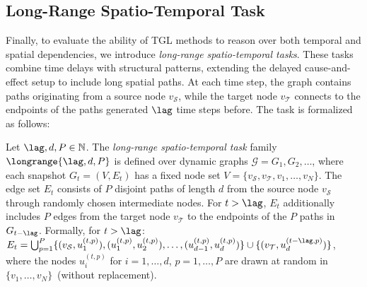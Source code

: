 

\subsection{Long-Range Spatio-Temporal Task}
Finally, to evaluate the ability of TGL methods to reason over both temporal and spatial dependencies, we introduce  \emph{long-range spatio-temporal tasks}. These tasks combine time delays with structural patterns, extending the delayed cause-and-effect setup to include long spatial paths.  At each time step, the graph contains paths originating from a source node \(v_{\mathcal S}\), while the target node \(v_{\mathcal T}\) connects to the endpoints of the paths generated $\lag$ time steps before.
 The task is formalized as follows:


\begin{definition}
 Let \(\lag, d, P \in \mathbb{N}\). The \emph{long-range spatio-temporal task} family \(\longrange{\lag,d,P}\) is defined over dynamic graphs \(\mathcal{G} = G_1, G_2, \dots\), where each snapshot $G_t = (V, E_t)$ has a fixed node set $V = \{v_{\mathcal S}, v_{\mathcal T}, v_1, \dots, v_{N}\}$. The edge set $E_t$ consists of $P$ disjoint paths of length $d$ from the source node $v_{\mathcal S}$ through randomly chosen intermediate nodes. For $t > \lag$, $E_t$ additionally includes $P$ edges from the target node $v_{\mathcal T}$ to the endpoints of the $P$ paths in $G_{t - \lag}$. Formally, for $t > \lag$:
$
E_t = \bigcup_{p=1}^P \{(v_{\mathcal S}, u_1^{(t,p)}), (u_1^{(t,p)}, u_2^{(t,p)}),\dots, (u_{d-1}^{(t,p)}, u_d^{(t,p)})\} \cup \{(v_{\mathcal T}, u_d^{(t-\lag,p)})\}$, where the nodes $u^{(t,p)}_{i}$ for $i=1,\dots,d$, $p=1,\dots,P$ are drawn at random in $\{v_1,\dots,v_N\}$~(without replacement).
\end{definition}\label{def:long_range}



